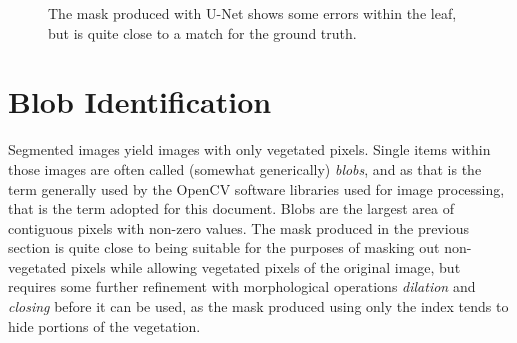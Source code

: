 \documentclass[letterpaper]{article}
\begin{document}
{{\begin{figure}[H]
	\centering
	\label{fig:unet-original}
	\hfill
	\label{fig:unet-mask}
	\hfill
	\label{fig:unet-original-masked}
	\caption[U-Net segmentation vs ground truth]{The mask produced with U-Net shows some errors within the leaf, but is quite close to a match for the ground truth.}
	\label{fig:u-net-segmentation}
\end{figure}


\section{Blob Identification}
Segmented images yield images with only vegetated pixels. Single items within those images are often called (somewhat generically) \textit{blobs}, and as that is the term generally used by the OpenCV software libraries used for image processing, that is the term adopted for this document. Blobs are the largest area of contiguous pixels with non-zero values.  The mask produced in the previous section is quite close to being suitable for the purposes of masking out non-vegetated pixels while allowing vegetated pixels of the original image, but requires some further refinement with morphological operations \textit{dilation} and \textit{closing} before it can be used, as the mask produced using only the index tends to hide portions of the vegetation.

}}
\end{document}
